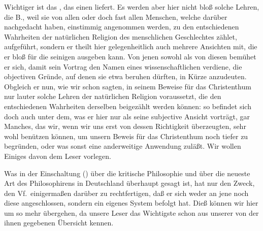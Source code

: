 Wichtiger ist das , das  einen  liefert. Es werden aber hier nicht bloß solche Lehren, die B., weil sie von allen oder doch fast allen Menschen, welche darüber nachgedacht haben, einstimmig angenommen werden, zu den entschiedenen Wahrheiten der natürlichen Religion des menschlichen Geschlechtes zählet, aufgeführt, sondern er theilt hier gelegenheitlich auch mehrere Ansichten mit, die er bloß für die seinigen ausgeben kann. Von jenen sowohl als von diesen bemühet er sich, damit sein Vortrag den Namen eines wissenschaftlichen verdiene, die objectiven Gründe, auf denen sie etwa beruhen dürften, in Kürze anzudeuten. Obgleich er nun, wie wir schon sagten, in seinem Beweise für das Christenthum nur lauter solche Lehren der natürlichen Religion voraussetzt, die den entschiedenen Wahrheiten derselben beigezählt werden können: so befindet sich doch  auch unter dem, was er hier nur als seine subjective Ansicht vorträgt, gar Manches, das wir, wenn wir uns erst von dessen Richtigkeit überzeugten, sehr wohl benützen können, um unsern Beweis für das Christenthum noch tiefer zu begründen, oder was sonst eine anderweitige Anwendung zuläßt. Wir wollen Einiges davon dem Leser vorlegen. \par
Was in der Einschaltung () über die kritische Philosophie und über die neueste Art des Philosophirens in Deutschland überhaupt gesagt ist, hat nur den Zweck, den Vf.\ einigermaßen darüber zu rechtfertigen, daß er sich weder an jene noch diese angeschlossen, sondern ein eigenes System befolgt hat. Dieß können wir hier um so mehr übergehen, da unsere Leser das Wichtigste schon aus unserer von der  ihnen gegebenen Übersicht kennen. \par
